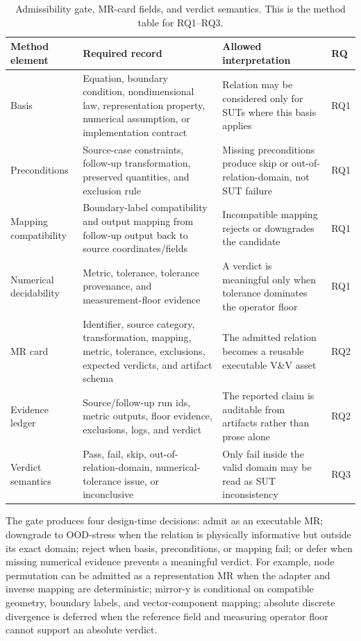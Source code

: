 \documentclass[preprint,12pt]{elsarticle}
\begin{document}
\begin{table}[H]
\centering
\caption{Admissibility gate, MR-card fields, and verdict semantics. This is the method table for RQ1--RQ3.}
\label{tab:rubric}
\small
\begin{tabularx}{\textwidth}{@{}>{\raggedright\arraybackslash}p{}>{\raggedright\arraybackslash}p{}>{\raggedright\arraybackslash}p{}Y@{}}
\toprule
\textbf{Method element} & \textbf{Required record} & \textbf{Allowed interpretation} & \textbf{RQ} \\
\midrule
Basis & Equation, boundary condition, nondimensional law, representation property, numerical assumption, or implementation contract & Relation may be considered only for SUTs where this basis applies & RQ1 \\
Preconditions & Source-case constraints, follow-up transformation, preserved quantities, and exclusion rule & Missing preconditions produce skip or out-of-relation-domain, not SUT failure & RQ1 \\
Mapping compatibility & Boundary-label compatibility and output mapping from follow-up output back to source coordinates/fields & Incompatible mapping rejects or downgrades the candidate & RQ1 \\
Numerical decidability & Metric, tolerance, tolerance provenance, and measurement-floor evidence & A verdict is meaningful only when tolerance dominates the operator floor & RQ1 \\
MR card & Identifier, source category, transformation, mapping, metric, tolerance, exclusions, expected verdicts, and artifact schema & The admitted relation becomes a reusable executable V\&V asset & RQ2 \\
Evidence ledger & Source/follow-up run ids, metric outputs, floor evidence, exclusions, logs, and verdict & The reported claim is auditable from artifacts rather than prose alone & RQ2 \\
Verdict semantics & Pass, fail, skip, out-of-relation-domain, numerical-tolerance issue, or inconclusive & Only fail inside the valid domain may be read as SUT inconsistency & RQ3 \\
\bottomrule
\end{tabularx}
\end{table}

The gate produces four design-time decisions: admit as an executable MR; downgrade to OOD-stress when the relation is physically informative but outside its exact domain; reject when basis, preconditions, or mapping fail; or defer when missing numerical evidence prevents a meaningful verdict. For example, node permutation can be admitted as a representation MR when the adapter and inverse mapping are deterministic; mirror-y is conditional on compatible geometry, boundary labels, and vector-component mapping; absolute discrete divergence is deferred when the reference field and measuring operator floor cannot support an absolute verdict.
\end{document}
